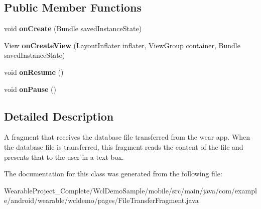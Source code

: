 \subsection*{Public Member Functions}
\begin{DoxyCompactItemize}
\item 
void {\bfseries on\+Create} (Bundle saved\+Instance\+State)\hypertarget{classcom_1_1example_1_1android_1_1wearable_1_1wcldemo_1_1pages_1_1FileTransferFragment_a3eb75e1a4482def8fadd653bbf3bc5ab}{}\label{classcom_1_1example_1_1android_1_1wearable_1_1wcldemo_1_1pages_1_1FileTransferFragment_a3eb75e1a4482def8fadd653bbf3bc5ab}

\item 
View {\bfseries on\+Create\+View} (Layout\+Inflater inflater, View\+Group container, Bundle saved\+Instance\+State)\hypertarget{classcom_1_1example_1_1android_1_1wearable_1_1wcldemo_1_1pages_1_1FileTransferFragment_a7b2e65ce50aa3cf0bd24f36eb15df15c}{}\label{classcom_1_1example_1_1android_1_1wearable_1_1wcldemo_1_1pages_1_1FileTransferFragment_a7b2e65ce50aa3cf0bd24f36eb15df15c}

\item 
void {\bfseries on\+Resume} ()\hypertarget{classcom_1_1example_1_1android_1_1wearable_1_1wcldemo_1_1pages_1_1FileTransferFragment_a889cb648d1f627c58d4da1883cd9e507}{}\label{classcom_1_1example_1_1android_1_1wearable_1_1wcldemo_1_1pages_1_1FileTransferFragment_a889cb648d1f627c58d4da1883cd9e507}

\item 
void {\bfseries on\+Pause} ()\hypertarget{classcom_1_1example_1_1android_1_1wearable_1_1wcldemo_1_1pages_1_1FileTransferFragment_a67be1849e5e3bdc263f37c2f1033a881}{}\label{classcom_1_1example_1_1android_1_1wearable_1_1wcldemo_1_1pages_1_1FileTransferFragment_a67be1849e5e3bdc263f37c2f1033a881}

\end{DoxyCompactItemize}


\subsection{Detailed Description}
A fragment that receives the database file transferred from the wear app. When the database file is transferred, this fragment reads the content of the file and presents that to the user in a text box. 

The documentation for this class was generated from the following file\+:\begin{DoxyCompactItemize}
\item 
Wearable\+Project\+\_\+\+Complete/\+Wcl\+Demo\+Sample/mobile/src/main/java/com/example/android/wearable/wcldemo/pages/File\+Transfer\+Fragment.\+java\end{DoxyCompactItemize}
